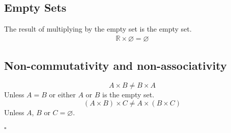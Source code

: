 \documentclass[a4paper]{article}
\begin{document}
\subsection{Empty Sets}
The result of multiplying by the empty set is the empty set.
\begin{align}
  \mathbb{R} \times \varnothing = \varnothing
\end{align}
\subsection{Non-commutativity and non-associativity}
\begin{equation}
  A \times B \neq B \times A
\end{equation}
Unless $A=B$ or either $A$ or $B$ is the empty set.
\begin{equation}
  (A \times B) \times C \neq A \times (B \times C)
\end{equation}
Unless $A$, $B$ or $C =\varnothing$.\\ \\
$\square$
\end{document}
